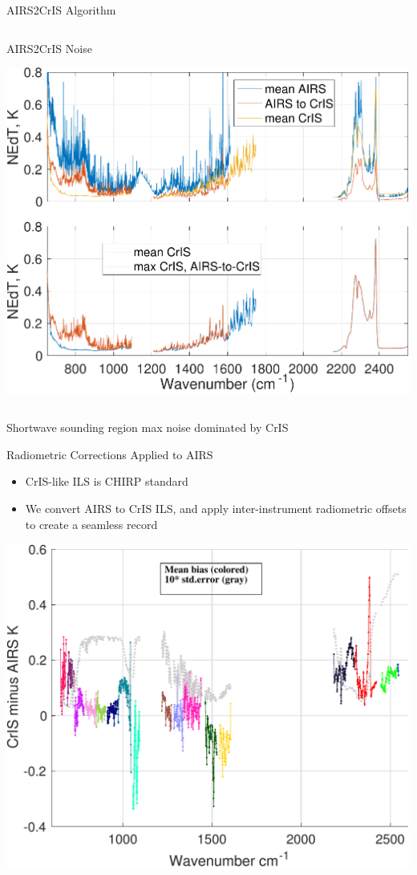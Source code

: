 \documentclass[10pt,t]{beamer}
\begin{document}
\begin{frame}[label={sec:org78aa51e}]{AIRS2CrIS Algorithm}
\begin{columns}
\begin{column}{0.55\columnwidth}
\begin{block}{\footnotesize AIRS2CrIS Noise}
\vspace{-0.1in}
\begin{center}
\includegraphics[width=0.95\linewidth]{./Figs/Pdf/a2cris_nedt.pdf}
\end{center}
\end{block}
\end{column}
\end{columns}

\vspace{-0.1in}
\small Shortwave sounding region max noise dominated by CrIS
\end{frame}

\begin{frame}[label={sec:orge611577}]{Radiometric Corrections Applied to AIRS}
\vspace{-0.1in}
\begin{itemize}
\item CrIS-like ILS is CHIRP standard
\item We convert AIRS to CrIS ILS, and apply inter-instrument radiometric offsets to create a seamless record
\end{itemize}
\begin{center}
\includegraphics[width=0.7\linewidth]{./ac_sno_2018_bias_stderr_coloraslp.pdf}
\end{center}
\end{frame}
\end{document}
